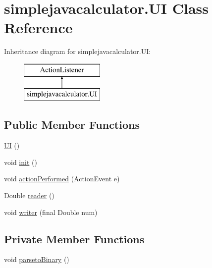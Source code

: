 \hypertarget{classsimplejavacalculator_1_1_u_i}{}\section{simplejavacalculator.\+UI Class Reference}
\label{classsimplejavacalculator_1_1_u_i}
Inheritance diagram for simplejavacalculator.\+UI\+:\begin{figure}[H]
\begin{center}
\leavevmode
\includegraphics[height=2.000000cm]{classsimplejavacalculator_1_1_u_i}
\end{center}
\end{figure}
\subsection*{Public Member Functions}
\begin{DoxyCompactItemize}
\item 
\mbox{\hyperlink{classsimplejavacalculator_1_1_u_i_a18381b38a31adbe19234bffe8129627f}{UI}} ()
\item 
void \mbox{\hyperlink{classsimplejavacalculator_1_1_u_i_a2e2bcbd9ef87019d1d118b21c10b95b4}{init}} ()
\item 
void \mbox{\hyperlink{classsimplejavacalculator_1_1_u_i_a90dee716b25c6fe985ca6258920545b3}{action\+Performed}} (Action\+Event e)
\item 
Double \mbox{\hyperlink{classsimplejavacalculator_1_1_u_i_abf9dbe93d4a32fbf6bf0cbd378d12500}{reader}} ()
\item 
void \mbox{\hyperlink{classsimplejavacalculator_1_1_u_i_a37891031a3188f7c98a6eda5d27142eb}{writer}} (final Double num)
\end{DoxyCompactItemize}
\subsection*{Private Member Functions}
\begin{DoxyCompactItemize}
\item 
void \mbox{\hyperlink{classsimplejavacalculator_1_1_u_i_a6e4aa552fab76600b6fbf11b9d114aac}{parseto\+Binary}} ()
\end{DoxyCompactItemize}
